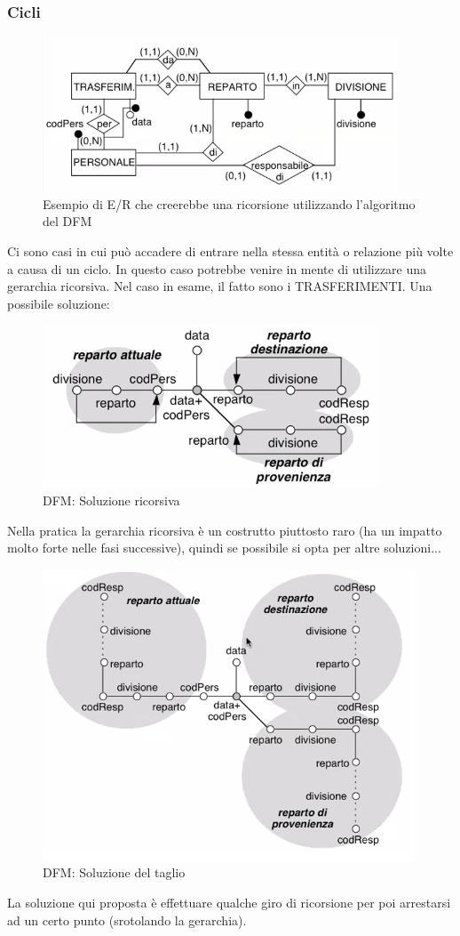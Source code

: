 \subsubsection{Cicli}
\begin{figure}[H]
	\begin{center}
		\includegraphics[width=0.5\linewidth]{img/errecur.PNG}
		\caption{Esempio di E/R che creerebbe una ricorsione utilizzando l'algoritmo del DFM}
	\end{center}
\end{figure}
\noindent Ci sono casi in cui può accadere di entrare nella stessa entità o relazione più volte a causa di un ciclo. In questo caso potrebbe venire in mente di utilizzare una gerarchia ricorsiva.
Nel caso in esame, il fatto sono i TRASFERIMENTI. Una possibile soluzione:
\begin{figure}[H]
	\begin{center}
		\includegraphics[width=0.5\linewidth]{img/dfmrecurs.PNG}
		\caption{DFM: Soluzione ricorsiva}
	\end{center}
\end{figure}
\noindent Nella pratica la gerarchia ricorsiva è un costrutto piuttosto raro (ha un impatto molto forte nelle fasi successive), quindi se possibile si opta per altre soluzioni...\newline
\begin{figure}[H]
	\begin{center}
		\includegraphics[width=0.5\linewidth]{img/dfmrecsol1.png}
		\caption{DFM: Soluzione del taglio}
	\end{center}
\end{figure}
\noindent La soluzione qui proposta è effettuare qualche giro di ricorsione per poi arrestarsi ad un certo punto (srotolando la gerarchia).
